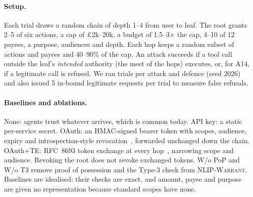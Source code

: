 \documentclass[sigconf,nonacm]{acmart}
\newcommand{\sys}{\textsc{NLIP-Warrant}}
\begin{document}
\paragraph{Setup.} Each trial draws a random chain of depth 1--4 from user to leaf. The root grants 2--5 of six actions, a cap of \pounds2k--20k, a budget of 1.5--3$\times$ the cap, 4--10 of 12 payees, a purpose, audiences and depth. Each hop keeps a random subset of actions and payees and 40--90\% of the cap. An attack succeeds if a tool call outside the leaf's \emph{intended} authority (the meet of the hops) executes, or, for A14, if a legitimate call is refused. We ran \resTrials{} trials per attack and defence (seed 2026) and also issued 5 in-bound legitimate requests per trial to measure false refusals.

\paragraph{Baselines and ablations.} \textsf{None}: agents trust whatever arrives, which is common today. \textsf{API key}: a static per-service secret. \textsf{OAuth}: an HMAC-signed bearer token with scopes, audience, expiry and introspection-style revocation~\cite{rfc6749,rfc7009}, forwarded unchanged down the chain. \textsf{OAuth+TE}: RFC~8693 token exchange at every hop~\cite{rfc8693}, narrowing scope and audience. Revoking the root does not revoke exchanged tokens. \textsf{W/o PoP} and \textsf{W/o T3} remove proof of possession and the Type-3 check from \sys{}. Baselines are idealised: their checks are exact, and amount, payee and purpose are given no representation because standard scopes have none.

\begin{table}[t]
\caption{Attack success rate (\%, lower is better) over \resTrials{} randomised delegation chains per cell. 95\% Wilson upper bound for 0/\resTrials{} is 0.8\%. R1 is residual risk: misuse inside legitimately held authority.}
\label{tab:attacks}
\small

\end{table}
\end{document}
